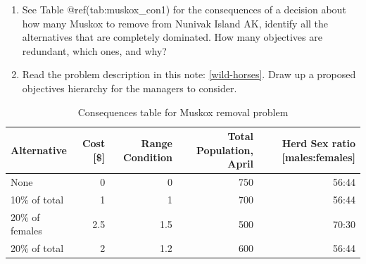 \documentclass[]{book}
\begin{document}
\begin{enumerate}
\def\labelenumi{\arabic{enumi}.}
\item
  See Table @ref(tab:muskox\_con1) for the consequences of a decision
  about how many Muskox to remove from Nunivak Island AK, identify all
  the alternatives that are completely dominated. How many objectives
  are redundant, which ones, and why?
\item
  Read the problem description in this note: \ref{wild-horses}. Draw up
  a proposed objectives hierarchy for the managers to consider.
\end{enumerate}

\begin{table}[tbp]
\caption{Consequences table for Muskox removal problem\label{tab:muskox_con1}}
\begin{tabulary}{0.7\textwidth}{lRRRR}
\toprule
   \textbf{Alternative}
  &\textbf{Cost [\$]}
  &\textbf{Range Condition}
  &\textbf{Total Population, April}
  &\textbf{Herd Sex ratio [males:females]}
\\\midrule
   None            & 0   & 0   & 750 & 56:44 
\\ 10\% of total   & 1   & 1   & 700 & 56:44
\\ 20\% of females & 2.5 & 1.5 & 500 & 70:30
\\ 20\% of total   & 2   & 1.2 & 600 & 56:44
\\\bottomrule
\end{tabulary}
\end{table}


\end{document}
